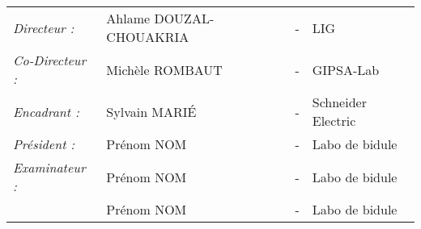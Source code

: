 \begin{titlepage}
\begin{center}
\begin{tabular}{llcl}
      \textit{Directeur :}	    & Ahlame DOUZAL-CHOUAKRIA & - & LIG\\
      \textit{Co-Directeur :}	& Michèle ROMBAUT	& - & GIPSA-Lab\\
      \textit{Encadrant :}	    & Sylvain MARI\'{E}	& - & Schneider Electric\\
      \textit{Président :}	    & Prénom NOM		& - & Labo de bidule\\
      \textit{Examinateur :}    & Prénom NOM        & - & Labo de bidule\\
                                & Prénom NOM        & - & Labo de bidule\\
\end{tabular}
\end{center}
\end{titlepage}
\sloppy

\titlepage

